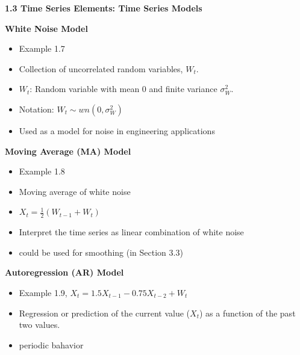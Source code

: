 \documentclass[12pt]{article} %
\date{}
\begin{document}
\textbf{\Large 1.3 Time Series Elements: Time Series Models}

\medskip


{}




\medskip
\medskip

\noindent \textbf{White Noise Model}

\begin{itemize}
	\item Example 1.7
	\item Collection of uncorrelated random variables, $W_t$.
	\item $W_t$: Random variable with mean 0 and finite variance $\sigma_W^2$.
	\item Notation: $W_t \sim wn(0,\sigma_W^2)$
	\item Used as a model for noise in engineering applications
\end{itemize}

\noindent \textbf{Moving Average (MA) Model}
\begin{itemize}
	\item Example 1.8
	\item Moving average of white noise
	\item $X_t = \frac{1}{2} (W_{t-1} + W_t )$
	\item Interpret the time series as linear combination of white noise
	\item could be used for smoothing (in Section 3.3)
\end{itemize}


\noindent\textbf{Autoregression (AR) Model}
\begin{itemize}
	\item Example 1.9, $X_t = 1.5 X_{t-1} -0.75 X_{t-2} + W_t$
	\item Regression or prediction of the current value ($X_t$) as a function of the past two values.
	\item periodic bahavior
\end{itemize}
\end{document}
